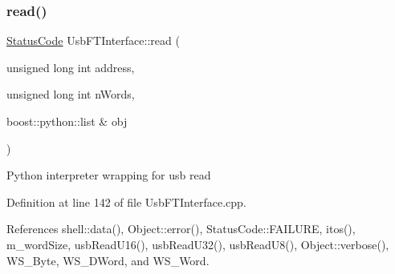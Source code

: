\subsubsection{\texorpdfstring{read()}{read()}\hspace{0.1cm}{\footnotesize\ttfamily [2/2]}}
{\footnotesize\ttfamily \hyperlink{classStatusCode}{Status\+Code} Usb\+F\+T\+Interface\+::read (\begin{DoxyParamCaption}\item[{unsigned long int}]{address,  }\item[{unsigned long int}]{n\+Words,  }\item[{boost\+::python\+::list \&}]{obj }\end{DoxyParamCaption})}

Python interpreter wrapping for usb read 

Definition at line 142 of file Usb\+F\+T\+Interface.\+cpp.



References shell\+::data(), Object\+::error(), Status\+Code\+::\+F\+A\+I\+L\+U\+RE, itos(), m\+\_\+word\+Size, usb\+Read\+U16(), usb\+Read\+U32(), usb\+Read\+U8(), Object\+::verbose(), W\+S\+\_\+\+Byte, W\+S\+\_\+\+D\+Word, and W\+S\+\_\+\+Word.


